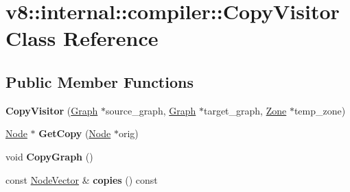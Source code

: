 \hypertarget{classv8_1_1internal_1_1compiler_1_1_copy_visitor}{}\section{v8\+:\+:internal\+:\+:compiler\+:\+:Copy\+Visitor Class Reference}
\label{classv8_1_1internal_1_1compiler_1_1_copy_visitor}
\subsection*{Public Member Functions}
\begin{DoxyCompactItemize}
\item 
{\bfseries Copy\+Visitor} (\hyperlink{classv8_1_1internal_1_1compiler_1_1_graph}{Graph} $\ast$source\+\_\+graph, \hyperlink{classv8_1_1internal_1_1compiler_1_1_graph}{Graph} $\ast$target\+\_\+graph, \hyperlink{classv8_1_1internal_1_1_zone}{Zone} $\ast$temp\+\_\+zone)\hypertarget{classv8_1_1internal_1_1compiler_1_1_copy_visitor_a188982dcd7c77a03515db75791067780}{}\label{classv8_1_1internal_1_1compiler_1_1_copy_visitor_a188982dcd7c77a03515db75791067780}

\item 
\hyperlink{classv8_1_1internal_1_1compiler_1_1_node}{Node} $\ast$ {\bfseries Get\+Copy} (\hyperlink{classv8_1_1internal_1_1compiler_1_1_node}{Node} $\ast$orig)\hypertarget{classv8_1_1internal_1_1compiler_1_1_copy_visitor_a141da9f566552dd17c443177fb9124b1}{}\label{classv8_1_1internal_1_1compiler_1_1_copy_visitor_a141da9f566552dd17c443177fb9124b1}

\item 
void {\bfseries Copy\+Graph} ()\hypertarget{classv8_1_1internal_1_1compiler_1_1_copy_visitor_ab1f67cdcbee8570bb8fa90e3f92efd8b}{}\label{classv8_1_1internal_1_1compiler_1_1_copy_visitor_ab1f67cdcbee8570bb8fa90e3f92efd8b}

\item 
const \hyperlink{classv8_1_1internal_1_1_zone_vector}{Node\+Vector} \& {\bfseries copies} () const \hypertarget{classv8_1_1internal_1_1compiler_1_1_copy_visitor_a7e55e0490947436a3bd972a29f2e5d76}{}\label{classv8_1_1internal_1_1compiler_1_1_copy_visitor_a7e55e0490947436a3bd972a29f2e5d76}

\end{DoxyCompactItemize}
